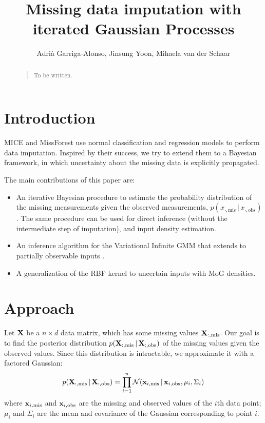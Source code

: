 \documentclass[letterpaper]{article}
\title{Missing data imputation with iterated Gaussian Processes}
\author{Adrià Garriga-Alonso, Jinsung Yoon, Mihaela van der Schaar}
\newcommand{\vbar}{\,|\,}
\newcommand{\vx}{{\bf x}}
\newcommand{\vX}{{\bf X}}
\begin{document}
\nocopyright
\maketitle

\begin{abstract}
\begin{quote}
  To be written.
\end{quote}
\end{abstract}

\section{Introduction}

\ac{MICE} \citep{van1999flexible} and MissForest
\citep{stekhoven2011missforest} use normal classification and regression models
to perform data imputation. Inspired by their success, we try to extend them to
a Bayesian framework, in which uncertainty about the missing data is explicitly
propagated.

The main contributions of this paper are:
\begin{itemize}
\item An iterative Bayesian procedure to estimate the probability distribution
of the missing measurements given the observed measurements,
$p(x_{\cdot,\text{mis}}\vbar x_{\cdot,\text{obs}})$. The same procedure can be used for direct
inference (without the intermediate step of imputation), and input density
estimation.

\item An inference algorithm for the Variational Infinite GMM
  \citep{blei2006variational} that extends to partially observable inputs
  \citep{DIZIO20075305}.

\item A generalization of the \acs{RBF} kernel to uncertain inputs with \ac{MoG}
densities.

\end{itemize}
\section{Approach}
Let $\bf X$ be a $n \times d$ data matrix, which has some missing values $\vX_{:,\text{mis}}$.
Our goal is to find the posterior distribution $p(\vX_{:,\text{mis}} \vbar
\vX_{:,\text{obs}})$ of the missing values given the observed values. Since this
distribution is intractable, we approximate it with a factored Gaussian:
\begin{equation}
  p(\vX_{:,\text{mis}} \vbar \vX_{:,\text{obs}}) = \prod_{i=1}^n \mathcal{N}(\vx_{i,\text{mis}} \vbar \vx_{i,\text{obs}}, \mu_i, \Sigma_i)
  \label{eq:point-factored-gaussian}
\end{equation}
where $\vx_{i,\text{mis}}$ and $\vx_{i,\text{obs}}$ are the missing and observed
values of the $i$th data point; $\mu_i$ and $\Sigma_i$ are the mean
and covariance of the Gaussian corresponding to point $i$.
\end{document}
